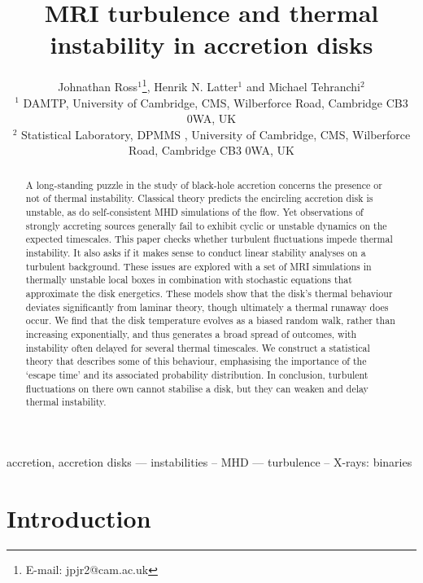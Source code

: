 \documentclass[useAMS]{mn2e}
\title{MRI turbulence and thermal instability in accretion disks}
\author[Ross, Latter \& Tehranchi]{Johnathan Ross$^{1}$\thanks{E-mail:
   jpjr2@cam.ac.uk},
   Henrik N. Latter$^{1}$ and Michael Tehranchi$^{2}$\\
$^{1}$ DAMTP, University of Cambridge, CMS, Wilberforce Road,
Cambridge CB3 0WA, UK\\
$^{2}$  Statistical Laboratory, DPMMS , University of Cambridge, CMS, Wilberforce Road,
Cambridge CB3 0WA, UK\\}
\date{}
\begin{document}
\maketitle

\begin{abstract}
A long-standing puzzle in the study of black-hole accretion concerns the
presence or not of thermal instability. Classical theory
predicts the
encircling accretion disk is unstable, as do
self-consistent MHD simulations of the flow.
Yet observations of strongly accreting sources generally fail to exhibit
cyclic or unstable dynamics on the expected timescales.
This paper checks whether turbulent fluctuations impede
thermal instability. It also asks if it makes sense to conduct
linear stability analyses on a turbulent background. 
These issues are explored with a set of MRI simulations in thermally
unstable local boxes
in combination with stochastic equations that approximate the
disk energetics. These models show that the disk's thermal behaviour deviates
significantly from laminar theory, though ultimately a thermal runaway
does occur. We find that the disk temperature evolves as a biased random
walk, rather than increasing exponentially, and thus generates 
a broad spread of outcomes, with instability often
delayed for several thermal timescales. We construct a 
statistical theory that describes some of this behaviour, emphasising
the importance of the `escape time' and its associated probability distribution.
In conclusion, turbulent fluctuations on there own cannot stabilise
a disk, but they can weaken and delay thermal instability. 
\end{abstract}


\begin{keywords}
  accretion, accretion disks  --- instabilities --
  MHD --- turbulence -- X-rays: binaries
\end{keywords}

\section{Introduction}
\end{document}

